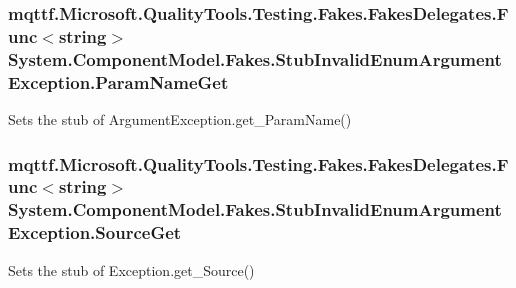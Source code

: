 \hypertarget{class_system_1_1_component_model_1_1_fakes_1_1_stub_invalid_enum_argument_exception_a5d4d9e46b562fc059f244c1f0fe15dcd}{
\subsubsection[{Param\-Name\-Get}]{\setlength{\rightskip}{0pt plus 5cm}mqttf.\-Microsoft.\-Quality\-Tools.\-Testing.\-Fakes.\-Fakes\-Delegates.\-Func$<$string$>$ System.\-Component\-Model.\-Fakes.\-Stub\-Invalid\-Enum\-Argument\-Exception.\-Param\-Name\-Get}}\label{class_system_1_1_component_model_1_1_fakes_1_1_stub_invalid_enum_argument_exception_a5d4d9e46b562fc059f244c1f0fe15dcd}


Sets the stub of Argument\-Exception.\-get\-\_\-\-Param\-Name()

\hypertarget{class_system_1_1_component_model_1_1_fakes_1_1_stub_invalid_enum_argument_exception_ada8c80bcbb13dbd6a35a6135ab3b6599}{
\subsubsection[{Source\-Get}]{\setlength{\rightskip}{0pt plus 5cm}mqttf.\-Microsoft.\-Quality\-Tools.\-Testing.\-Fakes.\-Fakes\-Delegates.\-Func$<$string$>$ System.\-Component\-Model.\-Fakes.\-Stub\-Invalid\-Enum\-Argument\-Exception.\-Source\-Get}}\label{class_system_1_1_component_model_1_1_fakes_1_1_stub_invalid_enum_argument_exception_ada8c80bcbb13dbd6a35a6135ab3b6599}


Sets the stub of Exception.\-get\-\_\-\-Source()

